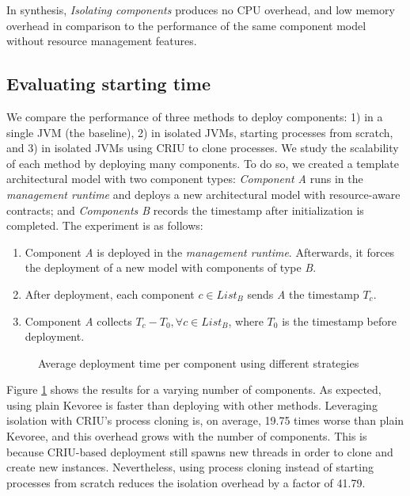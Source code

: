 In synthesis, \textit{Isolating components} produces no CPU overhead, and low memory overhead in comparison to the performance of the same component model without resource management features.


\subsection{Evaluating starting time}
We compare the performance of three methods to deploy components: 1) in a single JVM (the baseline), 2) in isolated JVMs, starting processes from scratch, and 3) in isolated JVMs using CRIU to clone processes.
We study the scalability of each method
 by deploying many components.
To do so, we created a template architectural model with two component types: \textit{Component A} runs in the \textit{management runtime} and deploys a new architectural model with resource-aware contracts; and \textit{Components B} records the timestamp after initialization is completed.
The experiment is as follows:
\begin{enumerate}
\item Component \textit{A} is deployed in the \textit{management runtime}. Afterwards, it forces the deployment of a new model with components of type \textit{B}.
\item After deployment, each component $c \in List_B$ sends \textit{A} the timestamp $T_c$.
\item Component \textit{A} collects $T_c - T_0, \forall {c \in List_B}$, where $T_0$ is the timestamp before deployment.
\end{enumerate}
 
\begin{figure}
\centering

\caption{Average deployment time per component using different strategies}
\label{fig:starting-kevorees-final}
\vspace{-0.5cm}
\end{figure}

Figure \ref{fig:starting-kevorees-final} shows the results for a varying number of components.
As expected, using plain Kevoree is faster than deploying with other methods.
Leveraging isolation with CRIU's process cloning is, on average, 19.75 times worse than plain Kevoree, and this overhead grows with the number of components.
This is because CRIU-based deployment still spawns new threads in order to clone and create new instances. 
Nevertheless, using process cloning instead of starting processes from scratch reduces the isolation overhead by a factor of 41.79.

